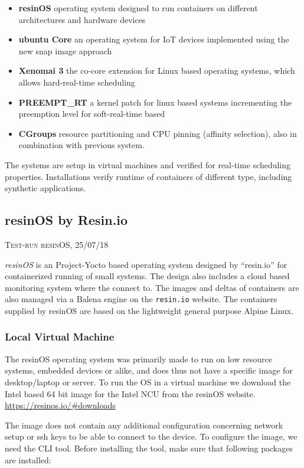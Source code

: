 \documentclass[]{scrartcl}
\begin{document}
\begin{itemize}
	\item \textbf{resinOS} operating system designed to run containers on different architectures and hardware devices
	\item \textbf{ubuntu Core} an operating system for IoT devices implemented using the new snap image approach
	\item \textbf{Xenomai 3} the co-core extension for Linux based operating systems, which allows hard-real-time scheduling
	\item \textbf{PREEMPT\_RT} a kernel patch for linux based systems incrementing the preemption level for soft-real-time based
	\item \textbf{CGroups} resource partitioning and CPU pinning (affinity selection), also in combination with previous system.
\end{itemize}

The systems are setup in virtual machines and verified for real-time scheduling properties. Installations verify runtime of containers of different type, including synthetic applications.

\subsection{resinOS by Resin.io}

{\small\textsc{Test-run resinOS, 25/07/18} \bigskip}

\textit{resinOS} is an Project-Yocto based operating system designed by ``resin.io'' for containerized running of small systems. The design also includes a cloud based monitoring system where the connect to. The images and deltas of containers are also managed via a Balena engine on the \texttt{resin.io} website. The containers supplied by resinOS are based on the lightweight general purpose Alpine Linux.

\subsubsection{Local Virtual Machine}

The resinOS operating system was primarily made to run on low resource systems, embedded devices or alike, and does thus not have a specific image for desktop/laptop or server. To run the OS in a virtual machine we download the Intel based 64 bit image for the Intel NCU from the resinOS website. \url{https://resinos.io/#downloads}

The image does not contain any additional configuration concerning network setup or ssh keys to be able to connect to the device. To configure the image, we need the CLI tool. Before installing the tool, make sure that following packages are installed:
\end{document}

